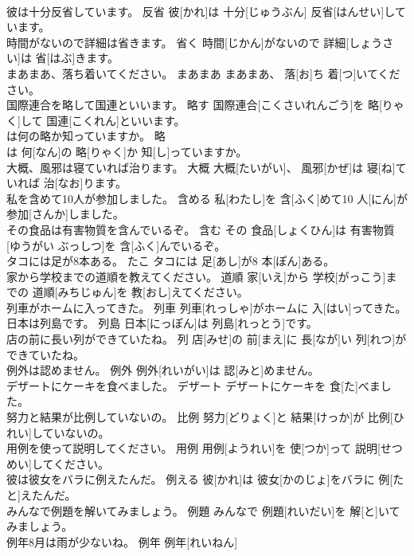 \documentclass[8pt]{extreport}
\begin{document}
\begin{CJK}{UTF8}{min}
\\	彼は十分反省しています。	反省	彼[かれ]は 十分[じゅうぶん] 反省[はんせい]しています。	
\\	時間がないので詳細は省きます。	省く	時間[じかん]がないので 詳細[しょうさい]は 省[はぶ]きます。	
\\	まあまあ、落ち着いてください。	まあまあ	まあまあ、 落[お]ち 着[つ]いてください。	
\\	国際連合を略して国連といいます。	略す	国際連合[こくさいれんごう]を 略[りゃく]して 国連[こくれん]といいます。	
\\	は何の略か知っていますか。	略	
\\	[あいてぃー]は 何[なん]の 略[りゃく]か 知[し]っていますか。	
\\	大概、風邪は寝ていれば治ります。	大概	大概[たいがい]、 風邪[かぜ]は 寝[ね]ていれば 治[なお]ります。	
\\	私を含めて10人が参加しました。	含める	私[わたし]を 含[ふく]めて10 人[にん]が 参加[さんか]しました。	
\\	その食品は有害物質を含んでいるぞ。	含む	その 食品[しょくひん]は 有害物質[ゆうがい ぶっしつ]を 含[ふく]んでいるぞ。	
\\	タコには足が8本ある。	たこ	タコには 足[あし]が8 本[ぽん]ある。	
\\	家から学校までの道順を教えてください。	道順	家[いえ]から 学校[がっこう]までの 道順[みちじゅん]を 教[おし]えてください。	
\\	列車がホームに入ってきた。	列車	列車[れっしゃ]がホームに 入[はい]ってきた。	
\\	日本は列島です。	列島	日本[にっぽん]は 列島[れっとう]です。	
\\	店の前に長い列ができていたね。	列	店[みせ]の 前[まえ]に 長[なが]い 列[れつ]ができていたね。	
\\	例外は認めません。	例外	例外[れいがい]は 認[みと]めません。	
\\	デザートにケーキを食べました。	デザート	デザートにケーキを 食[た]べました。	
\\	努力と結果が比例していないの。	比例	努力[どりょく]と 結果[けっか]が 比例[ひれい]していないの。	
\\	用例を使って説明してください。	用例	用例[ようれい]を 使[つか]って 説明[せつめい]してください。	
\\	彼は彼女をバラに例えたんだ。	例える	彼[かれ]は 彼女[かのじょ]をバラに 例[たと]えたんだ。	
\\	みんなで例題を解いてみましょう。	例題	みんなで 例題[れいだい]を 解[と]いてみましょう。	
\\	例年8月は雨が少ないね。	例年	例年[れいねん] 

\end{CJK}
\end{document}
